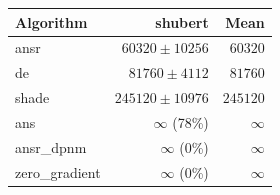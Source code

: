 \begin{tabular}{lrr}
\toprule
Algorithm & shubert & Mean \\
\midrule
ansr & $60320 \pm 10256$ & $60320$ \\
de & $81760 \pm 4112$ & $81760$ \\
shade & $245120 \pm 10976$ & $245120$ \\
ans & $\infty$ (78\%) & $\infty$ \\
ansr\_dpnm & $\infty$ (0\%) & $\infty$ \\
zero\_gradient & $\infty$ (0\%) & $\infty$ \\
\bottomrule
\end{tabular}
